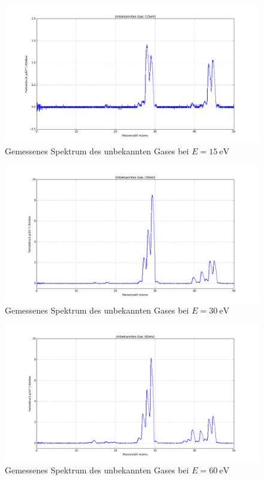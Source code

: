 \begin{figure}[ph]
	\centering\includegraphics[width=1.1\textwidth]{fig/a5_15ev.png}
	\caption{Gemessenes Spektrum des unbekannten Gases bei $E=\SI{15}{\electronvolt}$}
	\label{fig:v51}
\end{figure}

\begin{figure}[ph]
	\centering\includegraphics[width=1.1\textwidth]{fig/a5_30ev.png}
	\caption{Gemessenes Spektrum des unbekannten Gases bei $E=\SI{30}{\electronvolt}$}
	\label{fig:v52}
\end{figure}

\begin{figure}[ph]
	\centering\includegraphics[width=1.1\textwidth]{fig/a5_60ev.png}
	\caption{Gemessenes Spektrum des unbekannten Gases bei $E=\SI{60}{\electronvolt}$}
	\label{fig:v53}
\end{figure}

